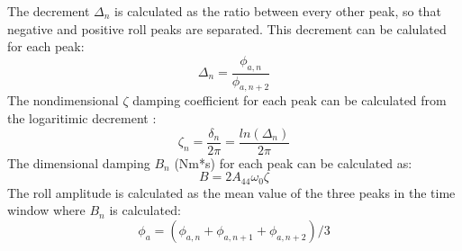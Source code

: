 The decrement $\Delta_n$ is calculated as the ratio between every
other peak, so that negative and positive roll peaks are separated. This
decrement can be calulated for each peak:
\begin{equation}
\Delta_n = \frac{\phi_{a,n}}{\phi_{a,n+2}}
\label{decrement}
\end{equation}
The nondimensional $\zeta$ damping coefficient for each peak can be
calculated from the logaritimic decrement \citep{7505983/BYNJ8CFG}:
\begin{equation}
\zeta_n = \frac{\delta_n}{2\pi}=\frac{ln(\Delta_n)}{2\pi}
\label{zeta_n}
\end{equation}
The dimensional damping $B_n$ (Nm*s) for each peak can be calculated
as:
\begin{equation}
B = 2 A_{44} \omega_{0} \zeta
\label{eq:B_1_zeta_eq}
\end{equation}
The roll amplitude is calculated as the mean value of the three peaks in
the time window where $B_n$ is calculated:
\begin{equation}
\phi_a = (\phi_{a,n} + \phi_{a,n+1} + \phi_{a,n+2})/3
\label{phi_a}
\end{equation}
